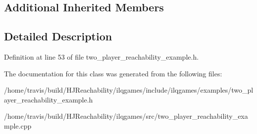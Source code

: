 \subsection*{Additional Inherited Members}


\subsection{Detailed Description}


Definition at line 53 of file two\+\_\+player\+\_\+reachability\+\_\+example.\+h.



The documentation for this class was generated from the following files\+:\begin{DoxyCompactItemize}
\item 
/home/travis/build/\+H\+J\+Reachability/ilqgames/include/ilqgames/examples/two\+\_\+player\+\_\+reachability\+\_\+example.\+h\item 
/home/travis/build/\+H\+J\+Reachability/ilqgames/src/two\+\_\+player\+\_\+reachability\+\_\+example.\+cpp\end{DoxyCompactItemize}
